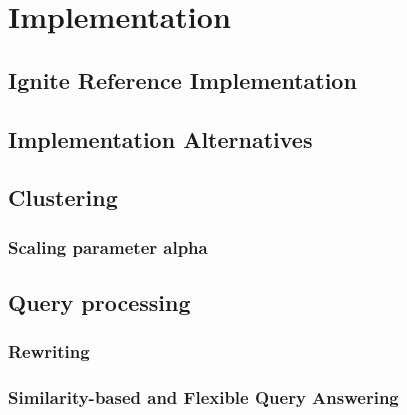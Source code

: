 
\section{Implementation}
\label{sec:impl}


\subsection{Ignite Reference Implementation}
\label{sec:impl_refimpl}

\subsection{Implementation Alternatives}
\label{sec:impl_alter}

\subsection{Clustering}
\label{sec:impl_clust}

\subsubsection{Scaling parameter alpha}

\subsection{Query processing}
\label{sec:impl_qpro}

\subsubsection{Rewriting}

\subsubsection{Similarity-based and Flexible Query Answering}